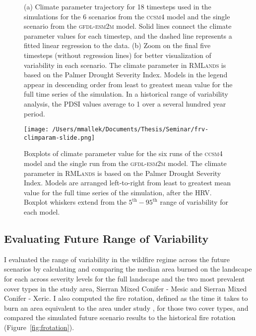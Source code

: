 \begin{figure}[!htbp]
\centering
    \caption{(a) Climate parameter trajectory for 18 timesteps used in the simulations for the 6 scenarios from the \textsc{ccsm4} model and the single scenario from the \textsc{gfdl-esm2m} model. Solid lines connect the climate parameter values for each timestep, and the dashed line represents a fitted linear regression to the data. (b) Zoom on the final five timesteps (without regression lines) for better visualization of variability in each scenario. The climate parameter in \textsc{RMLands} is based on the Palmer Drought Severity Index. Models in the legend appear in descending order from least to greatest mean value for the full time series of the simulation. In a historical range of variability analysis, the PDSI values average to 1 over a several hundred year period.}
\label{fig:pdsi_future}

\end{figure}

\begin{figure}[!htbp]
\centering
\texttt{[image: /Users/mmallek/Documents/Thesis/Seminar/frv-climparam-slide.png]}
\caption{Boxplots of climate parameter value for the six runs of the \textsc{ccsm4} model and the single run from the \textsc{gfdl-esm2m} model. The climate parameter in \textsc{RMLands} is based on the Palmer Drought Severity Index. Models are arranged left-to-right from least to greatest mean value for the full time series of the simulation, after the HRV. Boxplot whiskers extend from the $5^{\text{th}}-95^{\text{th}}$ range of variability for each model.}
\label{pdsi-boxplots}
\end{figure}


\subsection*{Evaluating Future Range of Variability}
I evaluated the range of variability in the wildfire regime across the future scenarios by calculating and comparing the median area burned on the landscape for each across severity levels for the full landscape and the two most prevalent cover types in the study area, Sierran Mixed Conifer - Mesic and Sierran Mixed Conifer - Xeric. %
I also computed the fire rotation, defined as the time it takes to burn an area equivalent to the area under study \citep{Agee1993}, for those two cover types, and compared the simulated future scenario results to the historical fire rotation (Figure~\ref{fig:frotation}). 
%


